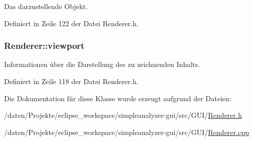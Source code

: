 Das darzustellende Objekt. 



Definiert in Zeile 122 der Datei Renderer.\-h.

\hypertarget{classRenderer_a4428a5ef0ceaf4de5c9991a40990994d}{
\subsubsection[{viewport}]{ Renderer\-::viewport\hspace{0.3cm}{\ttfamily [private]}}}\label{classRenderer_a4428a5ef0ceaf4de5c9991a40990994d}


Informationen über die Darstellung des zu zeichnenden Inhalts. 



Definiert in Zeile 118 der Datei Renderer.\-h.



Die Dokumentation für diese Klasse wurde erzeugt aufgrund der Dateien\-:\begin{DoxyCompactItemize}
\item 
/daten/\-Projekte/eclipse\-\_\-workspace/simpleanalyzer-\/gui/src/\-G\-U\-I/\hyperlink{Renderer_8h}{Renderer.\-h}\item 
/daten/\-Projekte/eclipse\-\_\-workspace/simpleanalyzer-\/gui/src/\-G\-U\-I/\hyperlink{Renderer_8cpp}{Renderer.\-cpp}\end{DoxyCompactItemize}
